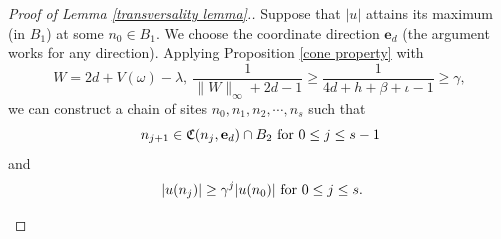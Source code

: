 \documentclass[11pt,reqno,UTF8,twoside]{amsart}
\newcommand{\bfe}{\mathbf{e}}
\theoremstyle{definition}
\numberwithin{equation}{section}
\begin{document}
\begin{proof}[Proof of Lemma \ref{transversality lemma}.]
    Suppose that $|u|$ attains its maximum  (in $B_1$)  at some  $n_0 \in B_1$. We choose the coordinate direction $\mathbf{e}_d$ (the argument works for any direction). Applying Proposition \ref{cone property} with
\begin{equation}\label{cone property parameter}
      W=2d+V(\omega)-\lambda,\  \frac{1}{\|W\|_{\infty}+2d-1} \geq \frac{1}{4d+h+\beta+\iota-1}\geq \gamma,
\end{equation}
 we can construct a chain of sites $n_0, n_1, n_2, \cdots, n_s$ such that
 \begin{equation}\label{Chain 1}
  n_{j+1}\in \mathfrak{C}(n_j,\bfe_d)\cap B_2  \  {\rm for} \ 0\leq j\leq s-1 
\end{equation}
and 
\begin{equation}\label{Chain transversality}
  \ |u(n_j)|\geq \gamma^{j}|u(n_0)| \ {\rm for} \   0\leq j\leq s.
\end{equation}











  
  \begin{figure}[htbp]
    \centering

    


\begin{tikzpicture}[x=0.75pt,y=0.75pt,yscale=-0.55,xscale=0.55]


\end{tikzpicture}
\end{figure}
\end{proof}
\end{document}
